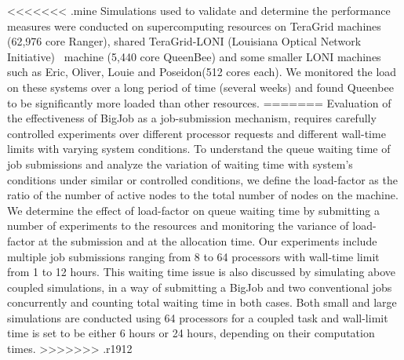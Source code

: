 \documentclass[conference,final]{IEEEtran}
\begin{document}
<<<<<<< .mine
Simulations used to validate and determine the performance measures were
conducted on supercomputing resources on TeraGrid machines (62,976
core Ranger), shared TeraGrid-LONI (Louisiana Optical Network
Initiative)~\cite{LONI_web} machine (5,440 core QueenBee)
and some smaller LONI machines such as Eric, Oliver, Louie and
Poseidon(512 cores each).  We monitored the load on these systems over a
long period of time (several weeks) and found Queenbee to be
significantly more loaded than other resources.
=======
Evaluation of the effectiveness of BigJob as a job-submission
mechanism, requires carefully controlled experiments over different
processor requests and different wall-time limits with varying system
conditions.  To understand the queue waiting time of job submissions
and analyze the variation of waiting time with system's conditions
under similar or controlled conditions, we define the load-factor as
the ratio of the number of active nodes to the total number of nodes
on the machine. We determine the effect of load-factor on queue
waiting time by submitting a number of experiments to the resources
and monitoring the variance of load-factor at the submission and at
the allocation time. Our experiments include multiple job submissions
ranging from 8 to 64 processors with wall-time limit from 1 to 12
hours. This waiting time issue is also discussed by simulating above
coupled simulations, in a way of submitting a BigJob and two
conventional jobs concurrently and counting total waiting time in both
cases. Both small and large simulations are conducted using 64
processors for a coupled task and wall-limit time is set to be either
6 hours or 24 hours, depending on their computation times.
>>>>>>> .r1912

\end{document}
